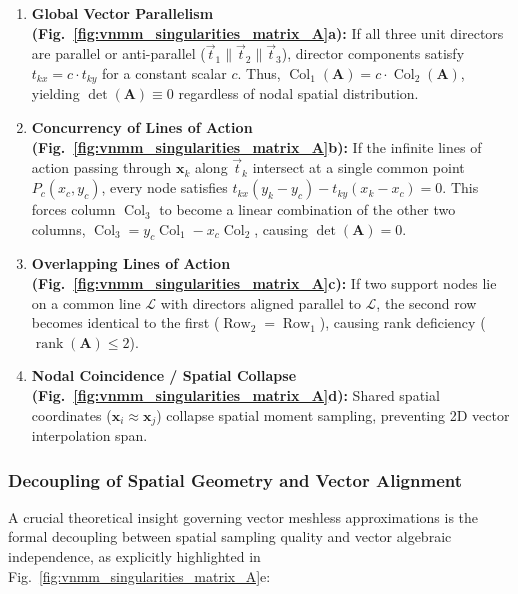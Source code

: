 \documentclass[preprint,12pt]{elsarticle}
\begin{document}
\begin{enumerate}
    \item \textbf{Global Vector Parallelism (Fig.~\ref{fig:vnmm_singularities_matrix_A}a):} If all three unit directors are parallel or anti-parallel ($\vec{t}_1 \parallel \vec{t}_2 \parallel \vec{t}_3$), director components satisfy $t_{kx} = c \cdot t_{ky}$ for a constant scalar $c$. Thus, $\operatorname{Col}_1(\mathbf{A}) = c \cdot \operatorname{Col}_2(\mathbf{A})$, yielding $\det(\mathbf{A}) \equiv 0$ regardless of nodal spatial distribution.

    \item \textbf{Concurrency of Lines of Action (Fig.~\ref{fig:vnmm_singularities_matrix_A}b):} If the infinite lines of action passing through $\mathbf{x}_k$ along $\vec{t}_k$ intersect at a single common point $P_c(x_c, y_c)$, every node satisfies $t_{kx}(y_k - y_c) - t_{ky}(x_k - x_c) = 0$. This forces column $\operatorname{Col}_3$ to become a linear combination of the other two columns, $\operatorname{Col}_3 = y_c \operatorname{Col}_1 - x_c \operatorname{Col}_2$, causing $\det(\mathbf{A}) = 0$.

    \item \textbf{Overlapping Lines of Action (Fig.~\ref{fig:vnmm_singularities_matrix_A}c):} If two support nodes lie on a common line $\mathcal{L}$ with directors aligned parallel to $\mathcal{L}$, the second row becomes identical to the first ($\operatorname{Row}_2 = \operatorname{Row}_1$), causing rank deficiency ($\operatorname{rank}(\mathbf{A}) \le 2$).

    \item \textbf{Nodal Coincidence / Spatial Collapse (Fig.~\ref{fig:vnmm_singularities_matrix_A}d):} Shared spatial coordinates ($\mathbf{x}_i \approx \mathbf{x}_j$) collapse spatial moment sampling, preventing 2D vector interpolation span.
\end{enumerate}

\subsubsection{Decoupling of Spatial Geometry and Vector Alignment}
\label{subsubsec:decoupling_L1}

A crucial theoretical insight governing vector meshless approximations is the formal decoupling between spatial sampling quality and vector algebraic independence, as explicitly highlighted in Fig.~\ref{fig:vnmm_singularities_matrix_A}e:
\end{document}
